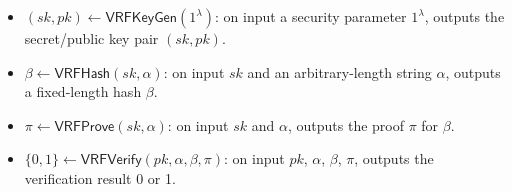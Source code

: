 \begin{itemize}
    \item $(sk, pk) \gets \mathsf{VRFKeyGen}(1^{\lambda})$: on input a security parameter $1^{\lambda}$, outputs the secret/public key pair $(sk, pk)$.
    \item $\beta \gets \mathsf{VRFHash}(sk, \alpha)$: on input $sk$ and an arbitrary-length string $\alpha$, outputs a fixed-length hash $\beta$.
    \item $\pi \gets \mathsf{VRFProve}(sk, \alpha)$: on input $sk$ and $\alpha$, outputs the proof $\pi$ for $\beta$.
    \item $\{0, 1\} \gets \mathsf{VRFVerify}(pk, \alpha, \beta, \pi)$: on input $pk$, $\alpha$, $\beta$, $\pi$, outputs the verification result 0 or 1.
\end{itemize}

